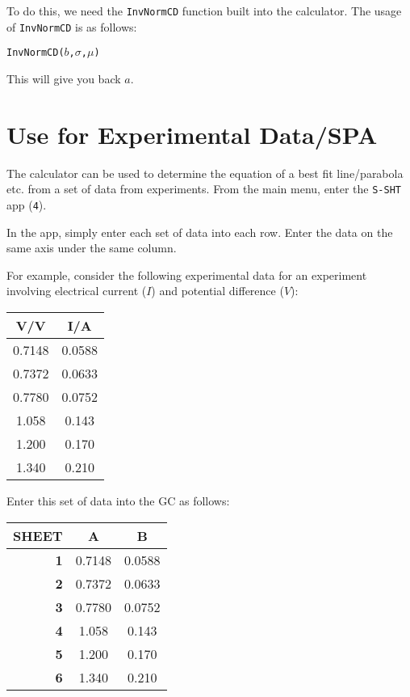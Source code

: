 \documentclass[a5paper,draft]{memoir}
\def\code#1{\texttt{#1}}
\newcommand{\addtoindex}[1]{#1\index{#1}}
\begin{document}
To do this, we need the \code{\addtoindex{InvNormCD}} function built into the calculator. The usage of \code{InvNormCD} is as follows:
\begin{center}
	\code{InvNormCD($b$,$\sigma$,$\mu$)}
\end{center}

This will give you back $a$.

\section{Use for Experimental Data/SPA}
The calculator can be used to determine the equation of a best fit line/parabola etc. from a set of data from experiments. From the main menu, enter the \code{S-SHT} app (\code{4}). 

In the app, simply enter each set of data into each row. Enter the data on the same axis under the same column.

For example, consider the following experimental data for an experiment involving electrical current ($I$) and potential difference ($V$): 

\begin{center}
	\setlength{\tabcolsep}{10pt}
	\renewcommand{\arraystretch}{1.2}
	\begin{tabular}{|c|c|}
		\hline
		\textbf{V/V}	& \textbf{I/A} \\
		\hline
		0.7148			& 0.0588 \\
		\hline
		0.7372			& 0.0633 \\
		\hline
		0.7780			& 0.0752 \\
		\hline
		1.058			& 0.143 \\
		\hline
		1.200			& 0.170 \\
		\hline
		1.340			& 0.210 \\
		\hline
	\end{tabular}
\end{center}

\pagebreak
Enter this set of data into the GC as follows:

\begin{center}
	\setlength{\tabcolsep}{10pt}
	\renewcommand{\arraystretch}{1.2}
	\begin{tabular}{|r|c|c|}
		\hline
		{\tiny SHEET}& \textbf{A}	& \textbf{B} \\
		\hline
		\textbf{1}	& 0.7148		& 0.0588 \\
		\hline
		\textbf{2}	& 0.7372		& 0.0633 \\
		\hline
		\textbf{3}	& 0.7780		& 0.0752 \\
		\hline
		\textbf{4}	& 1.058			& 0.143 \\
		\hline
		\textbf{5}	& 1.200			& 0.170 \\
		\hline
		\textbf{6}	& 1.340			& 0.210 \\
		\hline
	\end{tabular}
\end{center}
\end{document}
